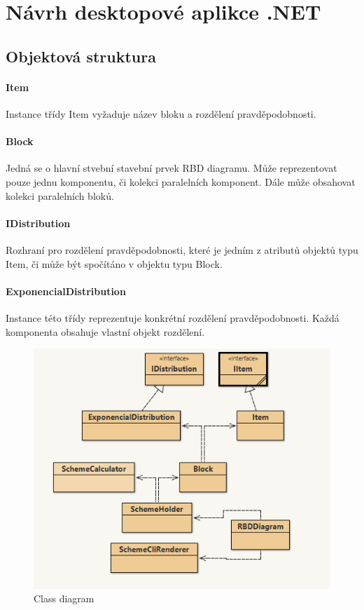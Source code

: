 \documentclass[FM,RP]{tulthesis}
\begin{document}
\chapter{Návrh desktopové aplikce .NET}
    \section{Objektová struktura}
        \subsubsection{Item}
            Instance třídy Item vyžaduje název bloku a rozdělení pravděpodobnosti. 
        \subsubsection{Block}
            Jedná se o hlavní stvební stavební prvek RBD diagramu. 
            Může reprezentovat pouze jednu komponentu, či kolekci paralelních komponent. 
            Dále může obsahovat kolekci paralelních bloků.
        \subsubsection{IDistribution}
            Rozhraní pro rozdělení pravděpodobnosti, které je jedním z atributů objektů typu Item, či může být spočítáno v objektu typu Block.
        \subsubsection{ExponencialDistribution}
            Instance této třídy reprezentuje konkrétní rozdělení pravděpodobnosti. Každá komponenta obsahuje vlastní objekt rozdělení.

    \begin{figure}[h]
        \centering
        \includegraphics[scale=0.75]{pic/class.png}
        \caption{Class diagram} \label{Obrázek č. 2.1}
    \end{figure}
    
\end{document}
